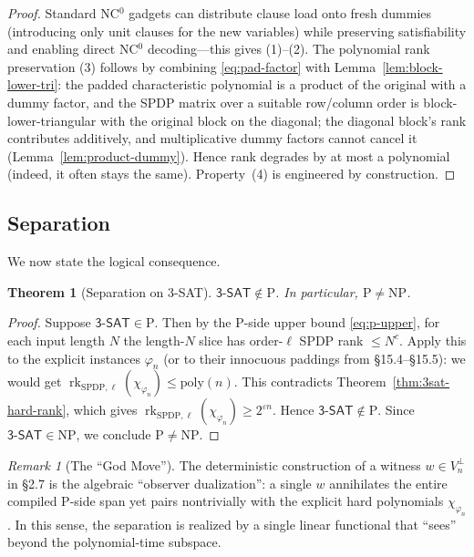 \documentclass[12pt]{article}
\newtheorem{theorem}{Theorem}
\theoremstyle{definition}
\theoremstyle{definition}
\theoremstyle{remark}
\newtheorem{remark}{Remark}
\theoremstyle{remark}
\begin{document}
\begin{proof}
Standard NC$^0$ gadgets can distribute clause load onto fresh dummies (introducing only unit clauses for the new variables) while preserving satisfiability and enabling direct NC$^0$ decoding---this gives (1)--(2).
The polynomial rank preservation (3) follows by combining \eqref{eq:pad-factor} with Lemma~\ref{lem:block-lower-tri}: the padded characteristic polynomial is a product of the original with a dummy factor, and the SPDP matrix over a suitable row/column order is block-lower-triangular with the original block on the diagonal; the diagonal block's rank contributes additively, and multiplicative dummy factors cannot cancel it (Lemma~\ref{lem:product-dummy}). Hence rank degrades by at most a polynomial (indeed, it often stays the same). Property~(4) is engineered by construction.
\end{proof}

\subsection{Separation}

We now state the logical consequence.

\begin{theorem}[Separation on 3-SAT]\label{thm:separation-3sat}
$\mathsf{3}\text{-}\mathsf{SAT}\notin\mathrm{P}$. In particular, $\mathrm{P}\neq\mathrm{NP}$.
\end{theorem}

\begin{proof}
Suppose $\mathsf{3}\text{-}\mathsf{SAT}\in\mathrm{P}$. Then by the P-side upper bound \eqref{eq:p-upper}, for each input length $N$ the length-$N$ slice has order-$\ell$ SPDP rank $\le N^c$. Apply this to the explicit instances $\varphi_n$ (or to their innocuous paddings from \S15.4--\S15.5): we would get $\operatorname{rk}_{\mathrm{SPDP},\ell}(\chi_{\varphi_n})\le\mathrm{poly}(n)$. This contradicts Theorem~\ref{thm:3sat-hard-rank}, which gives $\operatorname{rk}_{\mathrm{SPDP},\ell}(\chi_{\varphi_n})\ge 2^{\varepsilon n}$. Hence $\mathsf{3}\text{-}\mathsf{SAT}\notin\mathrm{P}$. Since $\mathsf{3}\text{-}\mathsf{SAT}\in\mathrm{NP}$, we conclude $\mathrm{P}\neq\mathrm{NP}$.
\end{proof}

\begin{remark}[The ``God Move'']
The deterministic construction of a witness $w\in V_n^\perp$ in \S2.7 is the algebraic ``observer dualization'': a single $w$ annihilates the entire compiled P-side span yet pairs nontrivially with the explicit hard polynomials $\chi_{\varphi_n}$. In this sense, the separation is realized by a single linear functional that ``sees'' beyond the polynomial-time subspace.
\end{remark}
\end{document}
